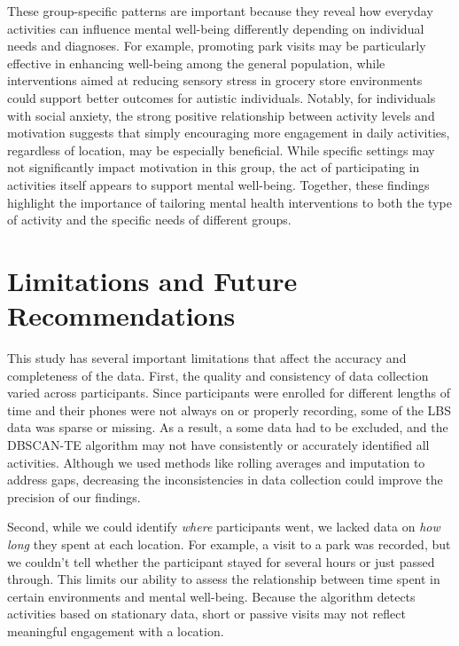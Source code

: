 \documentclass[
  letterpaper,
  number,
  review,
  3p]{elsarticle}
\begin{document}
These group-specific patterns are important because they reveal how
everyday activities can influence mental well-being differently
depending on individual needs and diagnoses. For example, promoting park
visits may be particularly effective in enhancing well-being among the
general population, while interventions aimed at reducing sensory stress
in grocery store environments could support better outcomes for autistic
individuals. Notably, for individuals with social anxiety, the strong
positive relationship between activity levels and motivation suggests
that simply encouraging more engagement in daily activities, regardless
of location, may be especially beneficial. While specific settings may
not significantly impact motivation in this group, the act of
participating in activities itself appears to support mental well-being.
Together, these findings highlight the importance of tailoring mental
health interventions to both the type of activity and the specific needs
of different groups.


\section{Limitations and Future
Recommendations}\label{limitations-and-future-recommendations}

This study has several important limitations that affect the accuracy
and completeness of the data. First, the quality and consistency of data
collection varied across participants. Since participants were enrolled
for different lengths of time and their phones were not always on or
properly recording, some of the LBS data was sparse or missing. As a
result, a some data had to be excluded, and the DBSCAN-TE algorithm may
not have consistently or accurately identified all activities. Although
we used methods like rolling averages and imputation to address gaps,
decreasing the inconsistencies in data collection could improve the
precision of our findings.

Second, while we could identify \emph{where} participants went, we
lacked data on \emph{how long} they spent at each location. For example,
a visit to a park was recorded, but we couldn't tell whether the
participant stayed for several hours or just passed through. This limits
our ability to assess the relationship between time spent in certain
environments and mental well-being. Because the algorithm detects
activities based on stationary data, short or passive visits may not
reflect meaningful engagement with a location.
\end{document}
